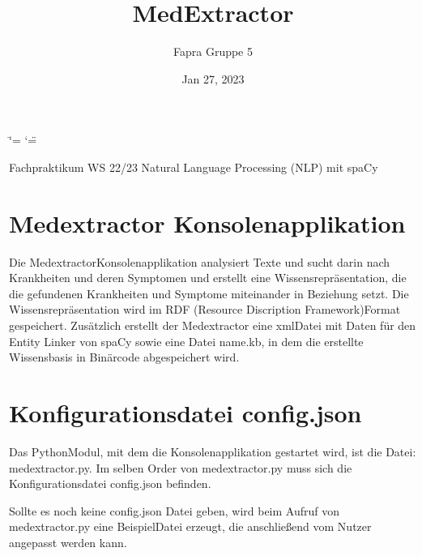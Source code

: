 \documentclass[letterpaper,10pt,english]{sphinxmanual}
\title{MedExtractor}
\date{Jan 27, 2023}
\author{Fapra Gruppe 5}
\begin{document}
\ifdefined\shorthandoff
  \ifnum\catcode`\=\string=\active\shorthandoff{=}\fi
  \ifnum\catcode`\"=\active{}\fi
\fi

\pagestyle{empty}
\sphinxmaketitle
\pagestyle{plain}
\sphinxtableofcontents
\pagestyle{normal}
\label{\detokenize{index::doc}}


\sphinxstepscope

\sphinxAtStartPar
Fachpraktikum WS 22/23 Natural Language Processing (NLP) mit spaCy


\chapter{Medextractor \sphinxhyphen{} Konsolenapplikation}
\label{\detokenize{readme:medextractor-konsolenapplikation}}\label{\detokenize{readme::doc}}
\sphinxAtStartPar
Die Medextractor\sphinxhyphen{}Konsolenapplikation analysiert Texte und sucht darin
nach Krankheiten und deren Symptomen und erstellt eine
Wissensrepräsentation, die die gefundenen Krankheiten und Symptome
miteinander in Beziehung setzt. Die Wissensrepräsentation wird im RDF
(Resource Discription Framework)\sphinxhyphen{}Format gespeichert. Zusätzlich erstellt
der Medextractor eine xml\sphinxhyphen{}Datei mit Daten für den Entity Linker von
spaCy sowie eine Datei name.kb, in dem die erstellte Wissensbasis in
Binärcode abgespeichert wird.


\chapter{Konfigurationsdatei config.json}
\label{\detokenize{readme:konfigurationsdatei-config-json}}
\sphinxAtStartPar
Das Python\sphinxhyphen{}Modul, mit dem die Konsolenapplikation gestartet wird, ist
die Datei: medextractor.py. Im selben Order von medextractor.py muss
sich die Konfigurationsdatei config.json befinden.

\sphinxAtStartPar
Sollte es noch keine config.json Datei geben, wird beim Aufruf von
medextractor.py eine Beispiel\sphinxhyphen{}Datei erzeugt, die anschließend vom Nutzer
angepasst werden kann.
\end{document}

